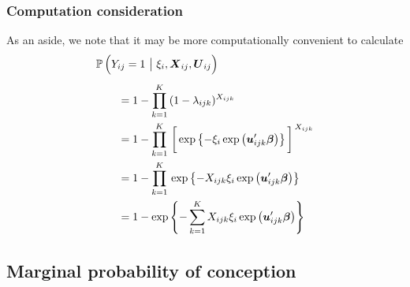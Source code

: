 \documentclass[11pt]{article}
\newcommand{\prob}{\mathbb{P}\,}
\renewcommand{\vec}{\boldsymbol}
\begin{document}
\subsubsection{Computation consideration}

As an aside, we note that it may be more computationally convenient to calculate
\begin{align*} \MoveEqLeft
\prob\Big( Y_{ij} = 1 ~\big|~ \xi_i, \vec{X}_{ij}, \vec{U}_{ij}  \Big) \\[1ex]
&= 1 - \prod_{k=1}^K\, (1 - \lambda_{ijk})^{X_{ijk}} \\
&= 1 - \prod_{k=1}^K\, \bigg[ \exp \left\{ -\xi_i \exp\left( \vec{u}_{ijk}^\prime \vec{\beta} \right) \right\} \bigg]^{\,X_{ijk}} \\
&= 1 - \prod_{k=1}^K\, \exp \left\{ -X_{ijk} \xi_i \exp\left( \vec{u}_{ijk}^\prime \vec{\beta} \right) \right\} \\
&= 1 - \exp \left\{ - \sum_{k=1}^K X_{ijk} \xi_i \exp\left( \vec{u}_{ijk}^\prime \vec{\beta} \right) \right\}
\end{align*}







\subsection{Marginal probability of conception}
\end{document}
